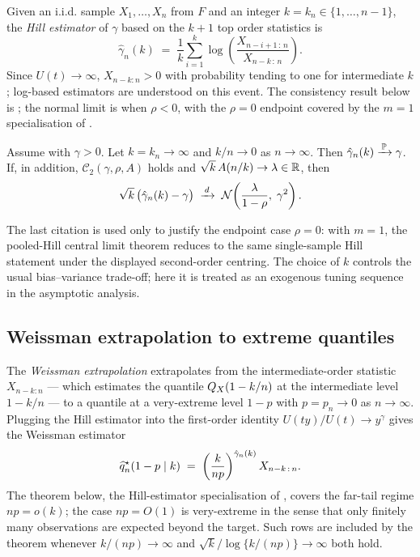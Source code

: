 Given an i.i.d. sample $X_{1}, \ldots, X_{n}$ from $F$ and an integer
$k = k_{n} \in \{1, \ldots, n-1\}$, the \emph{Hill estimator}
\parencite{Hill1975} of
$\gamma$ based on the $k + 1$ top order statistics is
\begin{equation}
\label{eq:bg:hill}
  \hat\gamma_{n}(k) \;=\; \frac{1}{k} \sum_{i=1}^{k} \log\!\left(
    \frac{X_{n-i+1\,:\,n}}{X_{n-k\,:\,n}} \right).
\end{equation}
Since $U(t)\to\infty$, $X_{n-k:n}>0$ with probability tending to one
for intermediate $k$; log-based estimators are understood on this event.
The consistency result
below is \textcite[Theorem~3.2.2]{deHaanFerreira2006}; the normal limit
is \textcite[Theorem~3.2.5]{deHaanFerreira2006} when $\rho<0$, with the
$\rho=0$ endpoint covered by the $m=1$ specialisation of
\textcite[Theorem~1]{DaouiaPadoanStupfler2021}.

\begin{theorem}
\label{thm:bg:hill}
Assume  with $\gamma > 0$. Let
$k = k_{n} \to \infty$ and $k / n \to 0$ as $n \to \infty$. Then
$\hat\gamma_{n}(k) \xrightarrow{\,\operatorname{\mathbb{P}}\,} \gamma$. If, in addition,
$\mathcal C_{2}(\gamma, \rho, A)$ holds and
$\sqrt{k}\, A(n/k) \to \lambda \in \mathbb{R}$, then
\[
  \sqrt{k}\,\big( \hat\gamma_{n}(k) - \gamma \big)
  \;\xrightarrow{\,d\,}\;
  \mathcal N\!\left( \frac{\lambda}{1 - \rho},\; \gamma^{2} \right).
\]
\end{theorem}

The last citation is used only to justify the endpoint case
\(\rho=0\): with \(m=1\), the pooled-Hill central limit theorem reduces to the
same single-sample Hill statement under the displayed second-order centring.
The choice of $k$ controls the usual bias--variance trade-off; here it is
treated as an exogenous tuning sequence in the asymptotic analysis.

\subsection{Weissman extrapolation to extreme quantiles}
\label{sec:bg:weissman}

The \emph{Weissman extrapolation} \parencite{Weissman1978} extrapolates
from the intermediate-order statistic $X_{n - k:n}$ --- which
estimates the quantile $Q_{X}(1 - k/n)$ at the intermediate level
$1 - k/n$ --- to a quantile at a very-extreme level $1 - p$ with
$p = p_{n} \to 0$ as $n \to \infty$. Plugging the Hill estimator into
the first-order identity $U(t y) / U(t) \to y^{\gamma}$ gives the
Weissman estimator
\begin{equation}
\label{eq:bg:weissman}
  \widehat{q}^{\star}_{n}(1 - p \mid k)
  \;=\; \left( \frac{k}{n p} \right)^{\hat\gamma_{n}(k)}
        X_{n - k\,:\,n}.
\end{equation}
The theorem below, the Hill-estimator specialisation of
\textcite[Theorem~4.3.8]{deHaanFerreira2006}, covers the far-tail
regime $np=o(k)$; the case $np=O(1)$ is very-extreme in the sense that
only finitely many observations are expected beyond the target. Such rows are
included by the theorem whenever \(k/(np)\to\infty\) and
\(\sqrt{k}/\log\{k/(np)\}\to\infty\) both hold.


